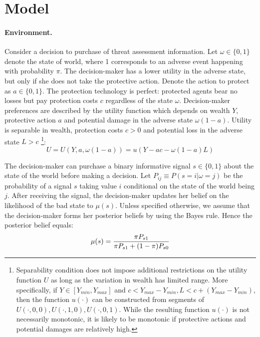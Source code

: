 \documentclass[12pt,a4paper]{article}
\begin{document}
\vspace{20pt}

\section{Model}
\paragraph{Environment.} Consider a decision to purchase of threat assessment information. Let $\omega \in \{0,1\}$ denote the state of world, where 1 corresponds to an adverse event happening with probability $\pi$. The decision-maker has a lower utility in the adverse state, but only if she does not take the protective action. Denote the action to protect as $a\in\{0,1\}$. The protection technology is perfect: protected agents bear no losses but pay protection costs $c$ regardless of the state $\omega$. Decision-maker preferences are described by the utility function which depends on wealth $Y$, protective action $a$ and potential damage in the adverse state $\omega(1-a)$. Utility is separable in wealth, protection costs $c>0$ and potential loss in the adverse state $L>c$ \footnote{Separability condition does not impose additional restrictions on the utility function $U$ as long as the variation in wealth has limited range. More specifically, if $Y \in [Y_{min},Y_{max}]$ and $c<Y_{max}-Y_{min}, L<c+(Y_{max}-Y_{min})$, then the function $u(\cdot)$ can be constructed from segments of $U(\cdot,0,0), U(\cdot,1,0), U(\cdot,0,1)$.  While the resulting function $u(\cdot)$ is not necessarily monotonic, it is likely to be monotonic if protective actions and potential damages are relatively high.}:
\begin{equation}
U=U(Y,a,\omega(1-a))=u(Y-ac-\omega(1-a)L)
\end{equation}

The decision-maker can purchase a binary informative signal $s\in\{0,1\}$ about the state of the world before making a decision. Let $P_{ij}\equiv P(s=i|\omega=j)$ be the probability of a signal $s$ taking value $i$ conditional on the state of the world being $j$.  After receiving the signal, the decision-maker updates her belief on the likelihood of the bad state to $\mu(s)$. Unless specified otherwise, we assume that the decision-maker forms her posterior beliefs by using the Bayes rule. Hence the posterior belief equals:
\begin{equation}
\mu(s)= {\pi P_{s1} \over \pi P_{s1}+(1-\pi)P_{s0}}
\end{equation}
\end{document}
